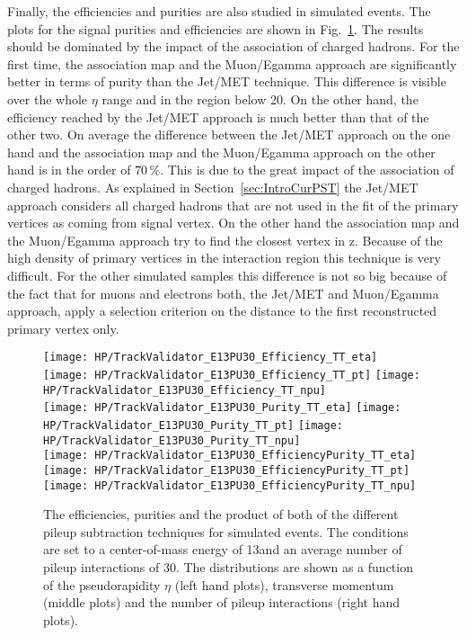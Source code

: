 Finally, the efficiencies and purities are also studied in simulated \ttbar events. The plots for the signal purities and efficiencies are shown in Fig.~\ref{plot:HPUTAE13PU30TTComp}. The results should be dominated by the impact of the association of charged hadrons. For the first time, the association map and the Muon/Egamma approach are significantly better in terms of purity  than the Jet/MET technique. This difference is visible over the whole $\eta$ range and in the \pt{} region below 20\GeV{}. On the other hand, the efficiency reached by the Jet/MET approach is much better than that of the other two. On average the difference between the Jet/MET approach on the one hand and the association map and the Muon/Egamma approach on the other hand is in the order of $70\,\%$. This is due to the great impact of the association of charged hadrons. As explained in Section~\ref{sec:IntroCurPST} the Jet/MET approach considers all charged hadrons that are not used in the fit of the primary vertices as coming from signal vertex. On the other hand the association map and the Muon/Egamma approach try to find the closest vertex in z. Because of the high density of primary vertices in the interaction region this technique is very difficult. For the other simulated samples this difference is not so big because of the fact that for muons and electrons both, the Jet/MET and Muon/Egamma approach, apply a selection criterion on the distance to the first reconstructed primary vertex only.

\begin{figure}[!t]
  \centering
  \texttt{[image: HP/TrackValidator\_E13PU30\_Efficiency\_TT\_eta]}
  \texttt{[image: HP/TrackValidator\_E13PU30\_Efficiency\_TT\_pt]}
  \texttt{[image: HP/TrackValidator\_E13PU30\_Efficiency\_TT\_npu]}
   \\
  \texttt{[image: HP/TrackValidator\_E13PU30\_Purity\_TT\_eta]}
  \texttt{[image: HP/TrackValidator\_E13PU30\_Purity\_TT\_pt]}
  \texttt{[image: HP/TrackValidator\_E13PU30\_Purity\_TT\_npu]}
   \\
  \texttt{[image: HP/TrackValidator\_E13PU30\_EfficiencyPurity\_TT\_eta]}
  \texttt{[image: HP/TrackValidator\_E13PU30\_EfficiencyPurity\_TT\_pt]}
  \texttt{[image: HP/TrackValidator\_E13PU30\_EfficiencyPurity\_TT\_npu]}
  \caption[Purities, efficiencies and their product of the different pileup subtraction techniques for \ttbar events with 13\TeV and PU=30]{The efficiencies, purities and the product of both of the different pileup subtraction techniques for simulated \ttbar events. The conditions are set to a center-of-mass energy of 13\TeV and an average number of pileup interactions of 30. The distributions are shown as a function of the pseudorapidity $\eta$ (left hand plots), transverse momentum (middle plots) and the number of pileup interactions (right hand plots). \label{plot:HPUTAE13PU30TTComp}}
\end{figure}

